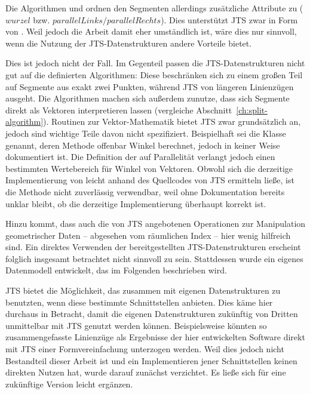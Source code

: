 \documentclass[../main/thesis.tex]{subfiles}
\begin{document}
Die Algorithmen  und  ordnen den Segmenten allerdings zusätzliche Attribute zu ($wurzel$ bzw. $parallelLinks / parallelRechts$).
Dies unterstützt JTS zwar in Form von .
Weil jedoch die Arbeit damit eher umständlich ist, wäre dies nur sinnvoll, wenn die Nutzung der JTS-Datenstrukturen andere Vorteile bietet.

Dies ist jedoch nicht der Fall.
Im Gegenteil passen die JTS-Datenstrukturen nicht gut auf die definierten Algorithmen:
Diese beschränken sich zu einem großen Teil auf Segmente aus exakt zwei Punkten, während JTS von längeren Linienzügen ausgeht.
Die Algorithmen machen sich außerdem zunutze, dass sich Segmente direkt als Vektoren interpretieren lassen (vergleiche Abschnitt~\ref{ch:split-algorithm}).
Routinen zur Vektor-Mathematik bietet JTS zwar grundsätzlich an, jedoch sind wichtige Teile davon nicht spezifiziert.
Beispielhaft sei die Klasse  genannt, deren Methode  offenbar Winkel berechnet, jedoch in keiner Weise dokumentiert ist.
Die Definition der  auf Parallelität verlangt jedoch einen bestimmten Wertebereich für Winkel von Vektoren.
Obwohl sich die derzeitige Implementierung von  leicht anhand des Quellcodes von JTS ermitteln ließe, ist die Methode nicht zuverlässig verwendbar, weil ohne Dokumentation bereits unklar bleibt, ob die derzeitige Implementierung überhaupt korrekt ist.

Hinzu kommt, dass auch die von JTS angebotenen Operationen zur Manipulation geometrischer Daten -- abgesehen vom räumlichen Index -- hier wenig hilfreich sind.
Ein direktes Verwenden der bereitgestellten JTS-Datenstrukturen erscheint folglich insgesamt betrachtet nicht sinnvoll zu sein.
Stattdessen wurde ein eigenes Datenmodell entwickelt, das im Folgenden beschrieben wird.

JTS bietet die Möglichkeit, das  zusammen mit eigenen Datenstrukturen zu benutzten, wenn diese bestimmte Schnittstellen anbieten.
Dies käme hier durchaus in Betracht, damit die eigenen Datenstrukturen zukünftig von Dritten unmittelbar mit JTS genutzt werden können.
Beispielsweise könnten so zusammengefasste Linienzüge als Ergebnisse der hier entwickelten Software direkt mit JTS einer Formvereinfachung unterzogen werden.
Weil dies jedoch nicht Bestandteil dieser Arbeit ist und ein Implementieren jener Schnittstellen keinen direkten Nutzen hat, wurde darauf zunächst verzichtet.
Es ließe sich für eine zukünftige Version leicht ergänzen.
\end{document}

